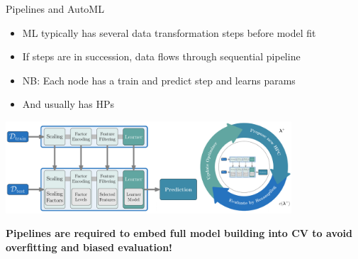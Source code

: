 \begin{vbframe}{Pipelines and AutoML}
\begin{itemize}
    \item ML typically has several data transformation steps before model fit
    \item If steps are in succession, data flows through sequential pipeline
    \item NB: Each node has a train and predict step and learns params
    \item And usually has HPs
\end{itemize}


\vspace{0.5em}

\begin{center}
\includegraphics[width = 0.8\textwidth]{figure_man/linear_pipeline.png}
\end{center}

\vspace{0.5em}

\textbf{Pipelines are required to embed full model building into CV to avoid overfitting and biased evaluation!}
\end{vbframe}

